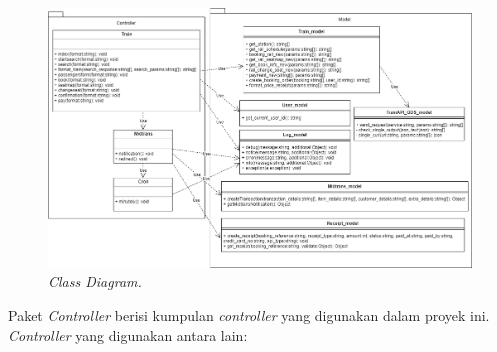 \begin{figure}[H]
\center
\includegraphics[width=\textwidth,height=\textheight,keepaspectratio]{Gambar/Class Diagram.png}
\caption{\textit{Class Diagram.}}
    \label{img:classdiagram}
\end{figure}

Paket \textit{Controller} berisi kumpulan \textit{controller} yang digunakan dalam proyek ini. \textit{Controller} yang digunakan antara lain:

